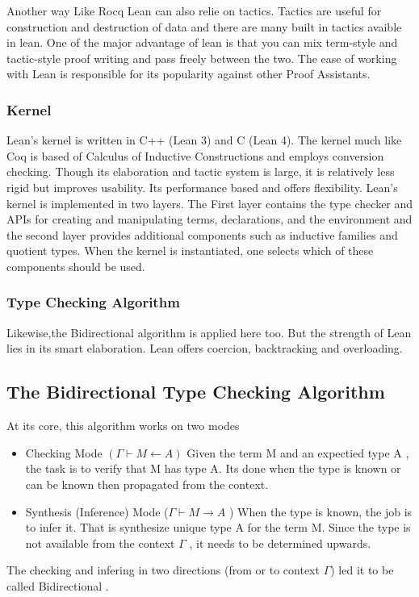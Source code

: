 \documentclass[12pt]{article}
\begin{document}
Another way Like Rocq Lean can also relie on tactics. Tactics are useful for construction and destruction of data and there are many built in tactics avaible in lean. One of the major advantage of lean 
is that you can mix term-style and tactic-style proof writing and pass freely between the two. 
The ease of working with Lean is responsible for its popularity against other Proof Assistants.
\subsubsection{Kernel}
Lean's kernel is written in C++ (Lean 3) and C (Lean 4). The kernel much like Coq is based of Calculus of Inductive Constructions and employs conversion checking. Though its elaboration and tactic system is large, it is relatively less rigid but improves usability. Its performance based and offers flexibility.
Lean's kernel is implemented in two layers. The First layer contains the
type checker and APIs for creating and manipulating terms, declarations, and
the environment and the second layer provides additional components such as inductive families and quotient types. When the kernel is
instantiated, one selects which of these components should be used.
\cite{Lean}
\subsubsection{Type Checking Algorithm}
Likewise,the Bidirectional algorithm is applied here too. But the strength of Lean lies in its smart elaboration. Lean offers coercion, backtracking and overloading. 

\subsection{The Bidirectional Type Checking Algorithm }

At its core, this algorithm works on two modes 
\begin{itemize}
    \item Checking Mode $(\Gamma \vdash M \leftarrow A )$ Given the term M and an expectied type A , the task is to verify that M has type A. Its done when the type is known or can be known then propagated from the context.
    \item Synthesis (Inference) Mode  ($\Gamma \vdash M \rightarrow A$ ) When the type is known, the job is to infer it. That is synthesize unique type A for the term M. Since the type is not available from the context $\Gamma$ , it needs to be determined upwards.
    
\end{itemize}
The checking and infering in two directions (from or to context $\Gamma$) led it to be called Bidirectional .
\\
\end{document}
